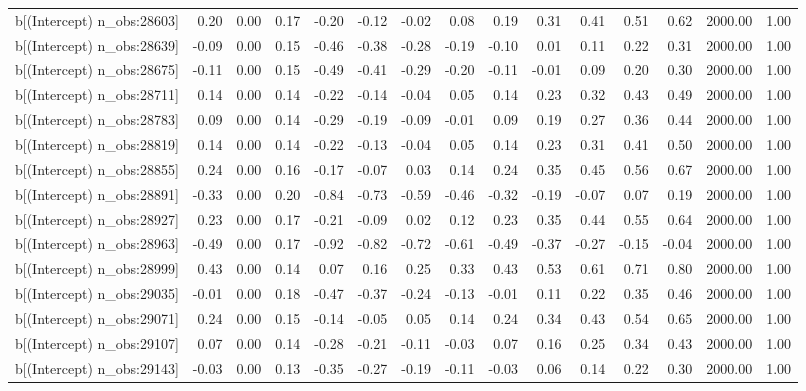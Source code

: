 \begin{table}[ht]
\begin{tabular}{rrrrrrrrrrrrrrr}
  b[(Intercept) n\_obs:28603] & 0.20 & 0.00 & 0.17 & -0.20 & -0.12 & -0.02 & 0.08 & 0.19 & 0.31 & 0.41 & 0.51 & 0.62 & 2000.00 & 1.00 \\ 
  b[(Intercept) n\_obs:28639] & -0.09 & 0.00 & 0.15 & -0.46 & -0.38 & -0.28 & -0.19 & -0.10 & 0.01 & 0.11 & 0.22 & 0.31 & 2000.00 & 1.00 \\ 
  b[(Intercept) n\_obs:28675] & -0.11 & 0.00 & 0.15 & -0.49 & -0.41 & -0.29 & -0.20 & -0.11 & -0.01 & 0.09 & 0.20 & 0.30 & 2000.00 & 1.00 \\ 
  b[(Intercept) n\_obs:28711] & 0.14 & 0.00 & 0.14 & -0.22 & -0.14 & -0.04 & 0.05 & 0.14 & 0.23 & 0.32 & 0.43 & 0.49 & 2000.00 & 1.00 \\ 
  b[(Intercept) n\_obs:28783] & 0.09 & 0.00 & 0.14 & -0.29 & -0.19 & -0.09 & -0.01 & 0.09 & 0.19 & 0.27 & 0.36 & 0.44 & 2000.00 & 1.00 \\ 
  b[(Intercept) n\_obs:28819] & 0.14 & 0.00 & 0.14 & -0.22 & -0.13 & -0.04 & 0.05 & 0.14 & 0.23 & 0.31 & 0.41 & 0.50 & 2000.00 & 1.00 \\ 
  b[(Intercept) n\_obs:28855] & 0.24 & 0.00 & 0.16 & -0.17 & -0.07 & 0.03 & 0.14 & 0.24 & 0.35 & 0.45 & 0.56 & 0.67 & 2000.00 & 1.00 \\ 
  b[(Intercept) n\_obs:28891] & -0.33 & 0.00 & 0.20 & -0.84 & -0.73 & -0.59 & -0.46 & -0.32 & -0.19 & -0.07 & 0.07 & 0.19 & 2000.00 & 1.00 \\ 
  b[(Intercept) n\_obs:28927] & 0.23 & 0.00 & 0.17 & -0.21 & -0.09 & 0.02 & 0.12 & 0.23 & 0.35 & 0.44 & 0.55 & 0.64 & 2000.00 & 1.00 \\ 
  b[(Intercept) n\_obs:28963] & -0.49 & 0.00 & 0.17 & -0.92 & -0.82 & -0.72 & -0.61 & -0.49 & -0.37 & -0.27 & -0.15 & -0.04 & 2000.00 & 1.00 \\ 
  b[(Intercept) n\_obs:28999] & 0.43 & 0.00 & 0.14 & 0.07 & 0.16 & 0.25 & 0.33 & 0.43 & 0.53 & 0.61 & 0.71 & 0.80 & 2000.00 & 1.00 \\ 
  b[(Intercept) n\_obs:29035] & -0.01 & 0.00 & 0.18 & -0.47 & -0.37 & -0.24 & -0.13 & -0.01 & 0.11 & 0.22 & 0.35 & 0.46 & 2000.00 & 1.00 \\ 
  b[(Intercept) n\_obs:29071] & 0.24 & 0.00 & 0.15 & -0.14 & -0.05 & 0.05 & 0.14 & 0.24 & 0.34 & 0.43 & 0.54 & 0.65 & 2000.00 & 1.00 \\ 
  b[(Intercept) n\_obs:29107] & 0.07 & 0.00 & 0.14 & -0.28 & -0.21 & -0.11 & -0.03 & 0.07 & 0.16 & 0.25 & 0.34 & 0.43 & 2000.00 & 1.00 \\ 
  b[(Intercept) n\_obs:29143] & -0.03 & 0.00 & 0.13 & -0.35 & -0.27 & -0.19 & -0.11 & -0.03 & 0.06 & 0.14 & 0.22 & 0.30 & 2000.00 & 1.00 \\ 

\end{tabular}
\end{table}
